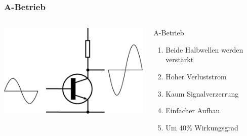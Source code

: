 \begin{frame}
  \frametitle{A-Betrieb}
  \begin{columns}[c]
    \begin{center}
      \includegraphics[width=1\textwidth,height=.8\textheight,keepaspectratio]{a07/Electronic_Amplifier_Class_A.png}\\
      {\tiny \hyperlink{refs}{\cite{wm}}}
    \end{center}
     \large
    \begin{block}{A-Betrieb}
      \begin{enumerate} 
        \item Beide Halbwellen werden verstärkt
        \item Hoher Verluststrom
        \item Kaum Signalverzerrung
        \item Einfacher Aufbau
        \item Um $40\%$ Wirkungsgrad
      \end{enumerate}
    \end{block}
  \end{columns}
\end{frame}


